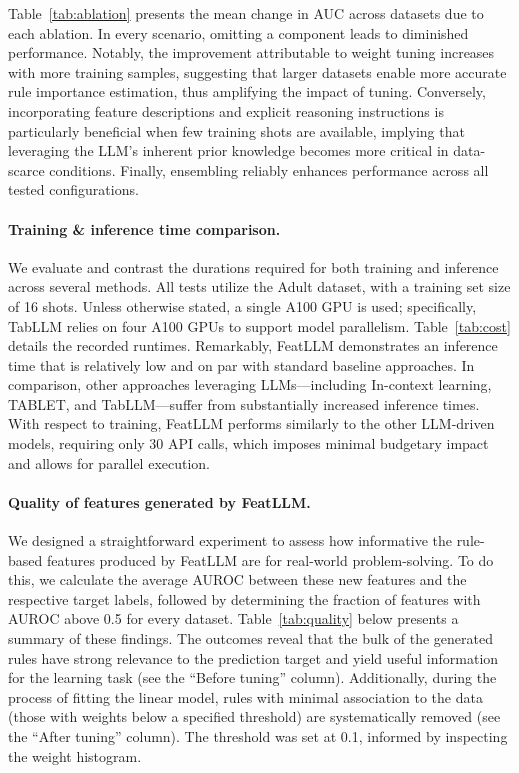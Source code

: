Table~\ref{tab:ablation} presents the mean change in AUC across datasets due to each ablation. In every scenario, omitting a component leads to diminished performance. Notably, the improvement attributable to weight tuning increases with more training samples, suggesting that larger datasets enable more accurate rule importance estimation, thus amplifying the impact of tuning. Conversely, incorporating feature descriptions and explicit reasoning instructions is particularly beneficial when few training shots are available, implying that leveraging the LLM's inherent prior knowledge becomes more critical in data-scarce conditions. Finally, ensembling reliably enhances performance across all tested configurations.

\vspace*{-0.12in}
\paragraph{Training \& inference time comparison.} We evaluate and contrast the durations required for both training and inference across several methods. All tests utilize the Adult dataset, with a training set size of 16 shots. Unless otherwise stated, a single A100 GPU is used; specifically, TabLLM relies on four A100 GPUs to support model parallelism. Table~\ref{tab:cost} details the recorded runtimes. Remarkably, \textsf{FeatLLM} demonstrates an inference time that is relatively low and on par with standard baseline approaches. In comparison, other approaches leveraging LLMs—including In-context learning, TABLET, and TabLLM—suffer from substantially increased inference times. With respect to training, \textsf{FeatLLM} performs similarly to the other LLM-driven models, requiring only 30 API calls, which imposes minimal budgetary impact and allows for parallel execution.

\vspace*{-0.12in}
\paragraph{Quality of features generated by \textsf{FeatLLM}.}
We designed a straightforward experiment to assess how informative the rule-based features produced by \textsf{FeatLLM} are for real-world problem-solving. To do this, we calculate the average AUROC between these new features and the respective target labels, followed by determining the fraction of features with AUROC above 0.5 for every dataset. Table~\ref{tab:quality} below presents a summary of these findings. The outcomes reveal that the bulk of the generated rules have strong relevance to the prediction target and yield useful information for the learning task (see the ``Before tuning'' column). Additionally, during the process of fitting the linear model, rules with minimal association to the data (those with weights below a specified threshold) are systematically removed (see the ``After tuning'' column). The threshold was set at 0.1, informed by inspecting the weight histogram.

